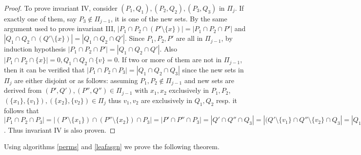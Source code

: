 \begin{proof}
  \noindent
  To prove invariant IV, consider $(P_1,Q_1),(P_2,Q_2), (P_3,Q_3)$ in
  $\Pi_j$. If exactly one of them, say $P_3 \notin \Pi_{j-1}$, it is
  one of the new sets. By the same argument used to prove invariant
  III, $|P_1 \cap P_2 \cap (P' \setminus \{x\})| = |P_1 \cap P_2 \cap
  P'|$ and $|Q_1 \cap Q_2 \cap (Q' \setminus \{x\})| = |Q_1 \cap Q_2
  \cap Q'|$. Since $P_1, P_2, P'$ are all in $\Pi_{j-1}$, by induction
  hypothesis $|P_1 \cap P_2 \cap P'| = |Q_1 \cap Q_2 \cap Q'|$. Also
  $|P_1 \cap P_2 \cap \{x\}| = 0, Q_1 \cap Q_2 \cap \{v\} = 0$.  If
  two or more of them are not in $\Pi_{j-1}$, then it can be verified
  that $|P_1 \cap P_2 \cap P_3| = |Q_1 \cap Q_2 \cap Q_3|$ since the
  new sets in $\Pi_j$ are either disjoint or as follows: assuming
  $P_1, P_2 \notin \Pi_{j-1}$ and new sets are derived from $(P', Q'),
  (P'', Q'') \in \Pi_{j-1}$ with $x_1, x_2$ exclusively in $P_1, P_2$,
  $(\{x_1\},\{v_1\}), (\{x_2\},\{v_2\}) \in \Pi_j $ thus $v_1, v_2$
  are exclusively in $Q_1, Q_2$ resp. it follows that $|P_1 \cap P_2
  \cap P_3| = |(P' \setminus \{x_1\}) \cap (P'' \setminus \{x_2\})
  \cap P_3| = |P' \cap P'' \cap P_3| = |Q' \cap Q'' \cap Q_3| = |(Q'
  \setminus \{v_1\} \cap Q'' \setminus \{v_2\} \cap Q_3| = |Q_1 \cap
  Q_2 \cap Q_3|$. Thus invariant IV is also proven.  %
\end{proof}

Using algorithms \ref{perms} and \ref{leafasgn} we prove the following
theorem.


